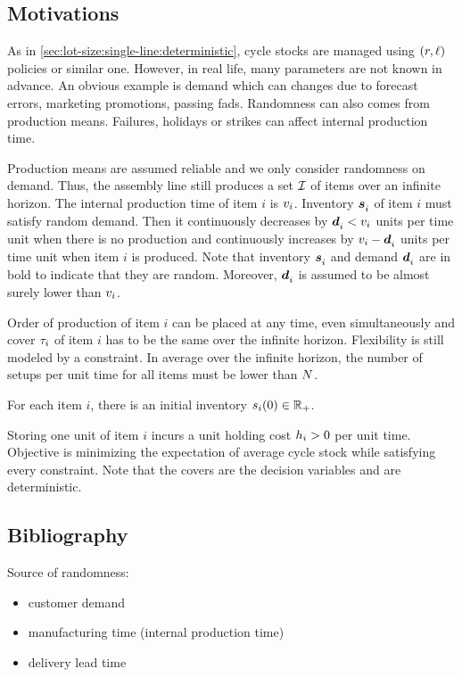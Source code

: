 \subsection{Motivations}
\label{sec:lot-size:single-line:stochastic:motivations}


As in \cref{sec:lot-size:single-line:deterministic}, cycle stocks are managed using $(r,\ell)$ policies or similar one.
However, in real life, many parameters are not known in advance.
An obvious example is demand which can changes due to forecast errors, marketing promotions, passing fads.
Randomness can also comes from production means.
Failures, holidays or strikes can affect internal production time.


Production means are assumed reliable and we only consider randomness on demand.
Thus, the assembly line still produces a set $\mathcal{I}$ of items over an infinite horizon.
The internal production time of item $i$ is $v_i$.
Inventory $\va\inventory_i$ of item $i$ must satisfy random demand.
Then it continuously decreases by $\va\demand_i<\rate_i$ units per time unit when there is no production and continuously increases by $\rate_i-\va\demand_i$ units per time unit when item $i$ is produced.
Note that inventory $\va\inventory_i$ and demand $\va\demand_i$ are in bold to indicate that they are random.
Moreover, $\va\demand_i$ is assumed to be almost surely lower than $v_i$.


Order of production of item $i$ can be placed at any time, even simultaneously and cover $\tau_i$ of item $i$ has to be the same over the infinite horizon.
Flexibility is still modeled by a constraint.
In average over the infinite horizon, the number of setups per unit time for all items must be lower than $N$.


For each item $i$, there is an initial inventory $s_i\bracket{0}\in\RR_+$.


Storing one unit of item $i$ incurs a unit holding cost $h_i>0$ per unit time.
Objective is minimizing the expectation of average cycle stock while satisfying every constraint.
Note that the covers are the decision variables and are deterministic.


\subsection{Bibliography}

Source of randomness:
\begin{itemize}
  \item customer demand
  \item manufacturing time (internal production time)
  \item delivery lead time
\end{itemize}

